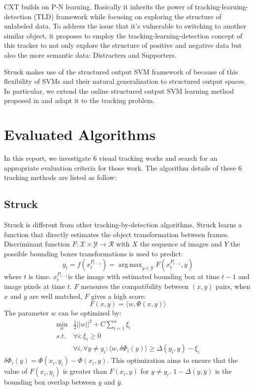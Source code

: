 \documentclass{acm_proc_article-sp}
\DeclareMathOperator*{\argmax}{arg\,max}
\DeclareMathOperator*{\minbelow}{min}
\begin{document}
CXT builds on P-N learning\cite{rw7}. 
Basically it inherits the power of tracking-learning-detection (TLD)\cite{rw8} framework while focusing on exploring the structure of unlabeled data.
To address the issue that it's vulnerable to switching to another similar object, it proposes to employ the tracking-learning-detection concept of this tracker to not only explore the structure of positive and negative data but also the more semantic data: Distracters and Supporters.

Struck makes use of the structured output SVM framework of\cite{rw9} because of this flexibility of SVMs and their natural generalization to structured output spaces.
In particular, we extend the online structured output SVM learning method proposed in\cite{rw10}\cite{rw11} and adapt it to the tracking problem.

\section{Evaluated Algorithms}
In this report, we investigate 6 visual tracking works and search for an appropriate evaluation criteria for those work. The algorithm details of these 6 tracking methods are listed as follow:

\subsection{Struck}
Struck\cite{struck} is different from other tracking-by-detection algorithms. Struck learns a function that directly estimates the object transformation between frames. Discriminant function $F:\mathcal{X} \times \mathcal{Y} \to \mathcal{R}$ with $X$ the sequence of images and $Y$ the possible bounding boxes transformations is used to predict:
\[
y_t = f(x_t^{P_{t-1}}) = \argmax_{y\in \mathcal{Y}}F(x_t^{P_{t-1}},y)
\]
where $t$ is time. $x_t^{P_{t-1}}$is the image with estimated bounding box at time $t-1$ and image pixels at time $t$. $F$ measures the compatibility between $(x,y)$ pairs, when $x$ and $y$ are well matched, $F$ gives a high score:
\[
F(x,y)=\langle w, \Phi(x,y) \rangle
\]
The parameter $w$ can be optimized by:
\begin{align}
\minbelow_w	&\frac{1}{2}||w||^2 + C \sum_{i=1}^n\xi_i\nonumber\\
	s.t.	&\forall i: \xi_i \ge 0\nonumber\\
			&\forall i, \forall y\not= y_i : \langle w, \delta\Phi_i(y)\rangle \ge \Delta(y_i,y)-\xi_i
\end{align}
$\delta\Phi_i(y)=\Phi(x_i, y_i) - \Phi(x_i, y)$. This optimization aims to ensure that the value of $F(x_i, y_i)$ is greater than $F(x_i, y)$ for $y\not= y_i$. $1-\Delta(y,\bar{y})$ is the bounding box overlap between $y$ and $\bar{y}$.
\end{document}
